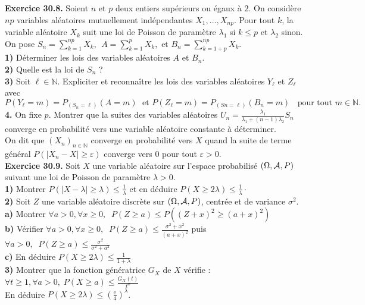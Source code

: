 \documentclass[a4paper,12pt,francais]{article}
\newcommand{\field}[1]{\mathbb{#1}}
\newcommand{\N}{\field{N}}
\newcommand{\e}{\mbox{e}}
\begin{document}
\noindent
{\bf Exercice 30.8.} %
Soient $n$ et $p$ deux entiers supérieurs ou  égaux à $2$. On considère $np$ variables aléatoires mutuellement indépendantes
$X_1, \dots, X_{np}$. Pour tout $k$, la variable
aléatoire $X_k$ suit une loi de Poisson de paramètre $\lambda_1$ si $k \leqslant p$ et $\lambda_2$ sinon. On pose 
$\displaystyle S_n=\sum_{k=1}^{np} X_k,\; \, A=\sum_{k=1}^{p} X_k, \mbox{ et } B_n=\sum_{k=1+p}^{np} X_k$.\\
{\bf 1)} Déterminer les lois des variables aléatoires $A$ et $B_n$.\\
{\bf 2)} Quelle est la loi de $S_n$ ?\\
{\bf 3)} Soit $\ell \in \N$. Expliciter et reconnaître les lois des variables aléatoires $Y_\ell$ et $Z_\ell$ avec\\
$\displaystyle P(Y_\ell = m) = P_{(S_n =\ell)} (A = m) \; \mbox{ et }
P(Z_\ell = m) = P_{(S n =\ell)} (B_n = m) \; \; \mbox{ pour tout } m \in \N.$\\
{\bf 4.} On fixe $p$. Montrer que la suites des variables aléatoires $U_n=\frac{\lambda_1}{\lambda_1+(n-1)\lambda_2}S_n$ converge en probabilité vers une variable aléatoire constante à déterminer.\\
On dit que $(X_n)_{n \in \N}$ converge en probabilité vers $X$ quand la suite de terme général $P(|X_n-X|\geqslant \varepsilon)$ converge vers $0$ pour tout $\varepsilon>0$.\\

\noindent
{\bf Exercice 30.9.} %
Soit $X$ une variable aléatoire sur l'espace probabilisé $(\Omega,{\cal{A}},P)$ suivant une loi de Poisson de paramètre $\lambda>0$.\\
{\bf 1)} Montrer $P(|X - \lambda|\geqslant \lambda) \leqslant \frac{1}{\lambda}$ et en déduire 
$P (X \geqslant 2\lambda) \leqslant \frac{1}{\lambda}\cdot$\\
{\bf 2)} Soit $Z$ une variable aléatoire discrète sur $(\Omega,{\cal{A}},P)$, centrée et de variance $\sigma^2$.\\
\indent
{\bf a)} Montrer $\forall a>0, \forall x \geqslant 0,\; \; P(Z \geqslant a) \leqslant P\left( {
(Z+x)^2 \geqslant (a+x)^2 }\right)$\\
\indent
{\bf b)} Vérifier $\forall a>0, \forall x \geqslant 0,\; \; P(Z \geqslant a) \leqslant \frac{\sigma^2+x^2}{(a+x)^2}$ puis 
$\forall a>0,\; \; P(Z \geqslant a) \leqslant \frac{\sigma^2}{\sigma^2+ a^2}$ \\
\indent
{\bf c)} En déduire $P(X \geqslant 2 \lambda) \leqslant \frac{1}{1+\lambda}$\\
{\bf 3)} Montrer que la fonction génératrice $G_X$ de $X$  vérifie : $\forall t \geqslant 1, \forall a>0,\; P(X \geqslant a) \leqslant \frac{G_X(t)}{t^a}$\\
En déduire $P(X \geqslant2 \lambda) \leqslant \left(\frac{\e}{4}\right)^\lambda$.\\
\end{document}
